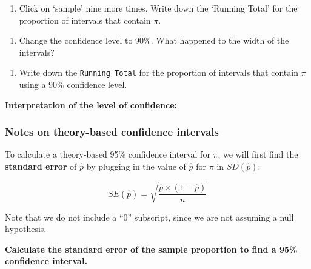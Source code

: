 \documentclass[
]{report}
\providecommand{\tightlist}{%
  \setlength{\itemsep}{0pt}\setlength{\parskip}{0pt}}
\begin{document}
\begin{enumerate}
\def\labelenumi{\arabic{enumi}.}
\setcounter{enumi}{2}
\tightlist
\item
  Click on `sample' nine more times. Write down the `Running Total' for the proportion of intervals that contain \(\pi\).
\end{enumerate}

\vspace{0.5in}

\begin{enumerate}
\def\labelenumi{\arabic{enumi}.}
\setcounter{enumi}{3}
\tightlist
\item
  Change the confidence level to 90\%. What happened to the width of the intervals?
\end{enumerate}

\vspace{0.2in}

\begin{enumerate}
\def\labelenumi{\arabic{enumi}.}
\setcounter{enumi}{4}
\tightlist
\item
  Write down the \texttt{Running\ Total} for the proportion of intervals that contain \(\pi\) using a 90\% confidence level.
\end{enumerate}

\vspace{0.4in}

\textbf{Interpretation of the level of confidence:}

\vspace{0.8in}

\subsubsection*{Notes on theory-based confidence intervals}\label{notes-on-theory-based-confidence-intervals}

To calculate a theory-based 95\% confidence interval for \(\pi\), we will first find the \textbf{standard error} of \(\hat{p}\) by plugging in the value of \(\hat{p}\) for \(\pi\) in \(SD(\hat{p})\):

\[SE(\hat{p}) = \sqrt{\frac{\hat{p}\times (1-\hat{p})}{n}}\]

Note that we do not include a ``0'' subscript, since we are not assuming a null hypothesis.

\textbf{Calculate the standard error of the sample proportion to find a 95\% confidence interval.}
\end{document}
